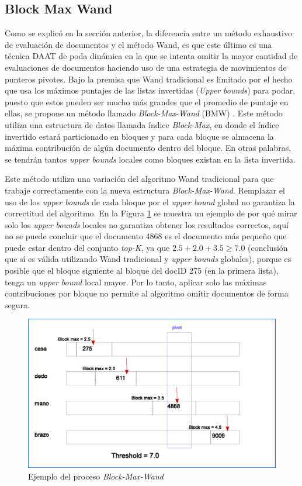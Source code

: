 \subsection{Block Max Wand}
\label{marco:bmw}
Como se explicó en la sección anterior, la diferencia entre un método exhaustivo de evaluación de documentos y el método Wand, es que este último es una técnica DAAT de poda dinámica \citep{Moffat:1996} en la que se intenta omitir la mayor cantidad de evaluaciones de documentos haciendo uso de una estrategia de movimientos de punteros pivotes.
Bajo la premisa que Wand tradicional es limitado por el hecho que usa los máximos puntajes de las listas invertidas (\textit{Upper bounds}) para podar, puesto que estos pueden ser mucho más grandes que el promedio de puntaje en ellas, se propone un método llamado \textit{Block-Max-Wand} (BMW) \citep{Ding:2011}. Este método utiliza una estructura de datos llamada índice \textit{Block-Max}, en donde el índice invertido estará particionado en bloques y para cada bloque se almacena la máxima contribución de algún documento dentro del bloque. En otras palabras, se tendrán tantos \textit{upper bounds} locales como bloques existan en la lista invertida.

Este método utiliza una variación del algoritmo Wand tradicional para que trabaje correctamente con la nueva estructura \textit{Block-Max-Wand}. Remplazar el uso de los \textit{upper bounds} de cada bloque por el \textit{upper bound} global no garantiza la correctitud del algoritmo. En la Figura \ref{fig:bmw} se muestra un ejemplo de por qué mirar solo los \textit{upper bounds} locales no garantiza obtener los resultados correctos, aquí no se puede concluir que el documento 4868 es el documento más pequeño que puede estar dentro del conjunto \textit{top-K}, ya que $2.5 + 2.0 + 3.5 \geq 7.0$ (conclusión que sí es válida utilizando Wand tradicional y \textit{upper bounds} globales), porque es posible que el bloque siguiente al bloque del docID 275 (en la primera lista), tenga un \textit{upper bound} local mayor. Por lo tanto, aplicar solo las máximas contribuciones por bloque no permite al algoritmo omitir documentos de forma segura.  

\begin{figure}[!th]
\centering
\includegraphics[scale=.75]{images/block-max-wand.eps}
\caption{Ejemplo del proceso \textit{Block-Max-Wand}}
\label{fig:bmw}
\end{figure}

